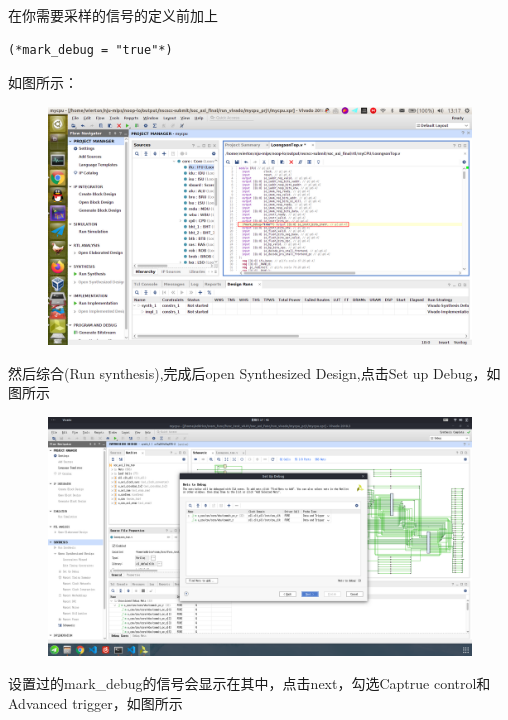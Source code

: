 \documentclass[lang=cn,11pt,a4paper]{elegantpaper}
\begin{document}
在你需要采样的信号的定义前加上 
\begin{lstlisting}
(*mark_debug = "true"*)
\end{lstlisting}
如图所示：
\begin{figure}[H]
\centering
\includegraphics[width=\linewidth]{image/mark_debug_1.png}
\end{figure}

然后综合(Run synthesis),完成后open Synthesized Design,点击Set up Debug，如图所示
\begin{figure}[H]
\centering
\includegraphics[width=\linewidth]{image/mark_debug_2.png}
\end{figure}
设置过的mark\_debug的信号会显示在其中，点击next，勾选Captrue control和Advanced trigger，如图所示
\end{document}
